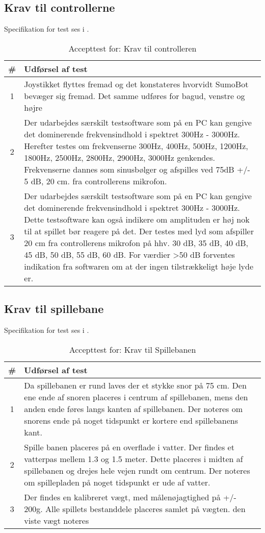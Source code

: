 \subsection{Krav til controllerne}
Specifikation for test ses i .
\begin{table}[]
\centering
\caption{Accepttest for: Krav til controlleren}\label{tab:ControllerKrav}
\begin{tabular}{c p{7cm}}
\# & \textbf{Udførsel af test} \\ \midrule
1 & Joystikket flyttes fremad og det konstateres hvorvidt SumoBot bevæger sig fremad. Det samme udføres for bagud, venstre og højre  \\\midrule
2 & Der udarbejdes særskilt testsoftware som på en PC kan gengive det dominerende frekvensindhold i spektret 300Hz - 3000Hz. Herefter testes om frekvenserne 300Hz, 400Hz, 500Hz, 1200Hz, 1800Hz, 2500Hz, 2800Hz, 2900Hz, 3000Hz genkendes. Frekvenserne dannes som sinusbølger og afspilles ved 75dB +/- 5 dB, 20 cm. fra controllerens mikrofon. \\\midrule
3 & Der udarbejdes særskilt testsoftware som på en PC kan gengive det dominerende frekvensindhold i spektret 300Hz - 3000Hz. Dette testsoftware kan også indikere om amplituden er høj nok til at spillet bør reagere på det. Der testes med lyd som afspiller 20 cm fra controllerens mikrofon på hhv. 30 dB, 35 dB, 40 dB, 45 dB, 50 dB, 55 dB, 60 dB. For værdier >50 dB forventes indikation fra softwaren om at der ingen tilstrækkeligt høje lyde er.\\\bottomrule
\end{tabular}
\end{table}

\subsection{Krav til spillebane}
Specifikation for test ses i .
\begin{table}[]
\centering
\caption{Accepttest for: Krav til Spillebanen}\label{tab:Spilbanekrav}
\begin{tabular}{c p{7cm}}
\# & \textbf{Udførsel af test} \\ \midrule
1 & Da spillebanen er rund laves der et stykke snor på 75 cm. Den ene ende af snoren placeres i centrum af spillebanen, mens den anden ende føres langs kanten af spillebanen. Der noteres om snorens ende på noget tidspunkt er kortere end spillebanens kant. \\\midrule
2 & Spille banen placeres på en overflade i vatter. Der findes et vatterpas mellem 1.3 og 1.5 meter. Dette placeres i midten af spillebanen og drejes hele vejen rundt om centrum. Der noteres om spillepladen på noget tidspunkt er ude af vatter.  \\\midrule

3 &  Der findes en kalibreret vægt, med målenøjagtighed på +/- 200g. Alle spillets bestanddele placeres samlet på vægten. den viste vægt noteres\\\midrule
\end{tabular}
\end{table}

